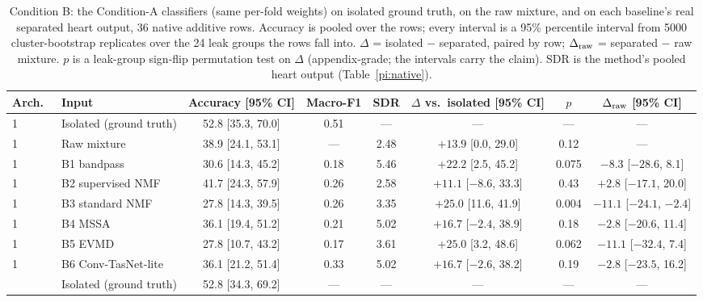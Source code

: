 \documentclass[conference]{IEEEtran}
\begin{document}
\begin{table}[htbp]
\centering
\caption{Condition B: the Condition-A classifiers (same per-fold weights) on isolated ground truth, on the raw mixture, and on each baseline's real separated heart output, 36 native additive rows. Accuracy is pooled over the rows; every interval is a 95\% percentile interval from 5000 cluster-bootstrap replicates over the 24 leak groups the rows fall into. $\Delta$ = isolated $-$ separated, paired by row; $\Delta_{\rm raw}$ = separated $-$ raw mixture. $p$ is a leak-group sign-flip permutation test on $\Delta$ (appendix-grade; the intervals carry the claim). SDR is the method's pooled heart output (Table~\ref{pi:native}).}
\label{pi:conditionB}
\small
\begin{tabular}{@{}llcccccc@{}}
\toprule
Arch.\ & Input & Accuracy [95\% CI] & Macro-F1 & SDR & $\Delta$ vs.\ isolated [95\% CI] & $p$ & $\Delta_{\rm raw}$ [95\% CI] \\
\midrule
1 & Isolated (ground truth) & 52.8 [35.3, 70.0] & 0.51 & --- & --- & --- & --- \\
1 & Raw mixture             & 38.9 [24.1, 53.1] & --- & 2.48 & $+13.9$ [0.0, 29.0] & 0.12 & --- \\
1 & B1 bandpass        & 30.6 [14.3, 45.2] & 0.18 & 5.46 & $+22.2$ [2.5, 45.2] & 0.075 & $-8.3$ [$-28.6$, 8.1] \\
1 & B2 supervised NMF  & 41.7 [24.3, 57.9] & 0.26 & 2.58 & $+11.1$ [$-8.6$, 33.3] & 0.43 & $+2.8$ [$-17.1$, 20.0] \\
1 & B3 standard NMF    & 27.8 [14.3, 39.5] & 0.26 & 3.35 & $+25.0$ [11.6, 41.9] & 0.004 & $-11.1$ [$-24.1$, $-2.4$] \\
1 & B4 MSSA            & 36.1 [19.4, 51.2] & 0.21 & 5.02 & $+16.7$ [$-2.4$, 38.9] & 0.18 & $-2.8$ [$-20.6$, 11.4] \\
1 & B5 EVMD            & 27.8 [10.7, 43.2] & 0.17 & 3.61 & $+25.0$ [3.2, 48.6] & 0.062 & $-11.1$ [$-32.4$, 7.4] \\
1 & B6 Conv-TasNet-lite & 36.1 [21.2, 51.4] & 0.33 & 5.02 & $+16.7$ [$-2.6$, 38.2] & 0.19 & $-2.8$ [$-23.5$, 16.2] \\
\addlinespace
2 & Isolated (ground truth) & 52.8 [34.3, 69.2] & --- & --- & --- & --- & --- \\

\end{tabular}
\end{table}
\end{document}
